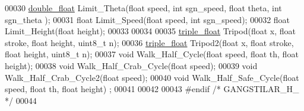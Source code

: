 \begin{DoxyCode}
00030 \hyperlink{structdouble__float}{double\_float} Limit\_Theta(\textcolor{keywordtype}{float} speed, \textcolor{keywordtype}{int} sgn\_speed, \textcolor{keywordtype}{float} theta, \textcolor{keywordtype}{int} sgn\_theta );
00031 \textcolor{keywordtype}{float} Limit\_Speed(\textcolor{keywordtype}{float} speed, \textcolor{keywordtype}{int} sgn\_speed);
00032 \textcolor{keywordtype}{float} Limit\_Height(\textcolor{keywordtype}{float} height);
00033 
00034 
00035 \hyperlink{structtriple__float}{triple\_float} Tripod(\textcolor{keywordtype}{float} x, \textcolor{keywordtype}{float} stroke, \textcolor{keywordtype}{float} height, uint8\_t n);
00036 \hyperlink{structtriple__float}{triple\_float} Tripod2(\textcolor{keywordtype}{float} x, \textcolor{keywordtype}{float} stroke, \textcolor{keywordtype}{float} height, uint8\_t n);
00037 \textcolor{keywordtype}{void} Walk\_Half\_Cycle(\textcolor{keywordtype}{float} speed, \textcolor{keywordtype}{float} th, \textcolor{keywordtype}{float} height);
00038 \textcolor{keywordtype}{void} Walk\_Half\_Crab\_Cycle(\textcolor{keywordtype}{float} speed);
00039 \textcolor{keywordtype}{void} Walk\_Half\_Crab\_Cycle2(\textcolor{keywordtype}{float} speed);
00040 \textcolor{keywordtype}{void} Walk\_Half\_Safe\_Cycle(\textcolor{keywordtype}{float} speed, \textcolor{keywordtype}{float} th, \textcolor{keywordtype}{float} height) ;
00041 
00042 
00043 \textcolor{preprocessor}{#endif }\textcolor{comment}{/* GANGSTILAR\_H\_ */}\textcolor{preprocessor}{}
00044 
\end{DoxyCode}
